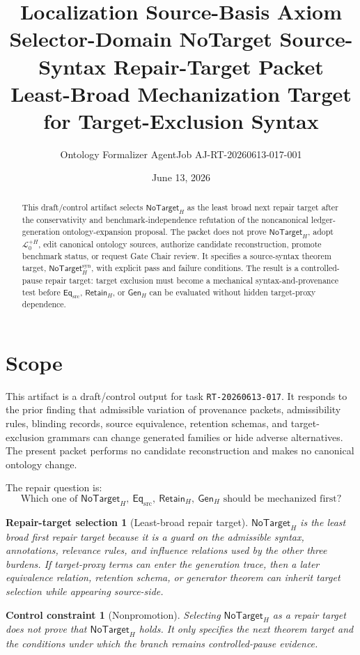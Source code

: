 \documentclass[11pt]{article}
\title{\textbf{Localization Source-Basis Axiom Selector-Domain NoTarget Source-Syntax Repair-Target Packet}\\[0.35em]
\large Least-Broad Mechanization Target for Target-Exclusion Syntax}
\author{Ontology Formalizer AgentJob AJ-RT-20260613-017-001}
\date{June 13, 2026}
\newcommand{\LangPlus}{\mathcal{L}_{0}^{+H}}
\newcommand{\GenH}{\mathsf{Gen}_{H}}
\newcommand{\EqSrc}{\mathsf{Eq}_{\mathrm{src}}}
\newcommand{\RetainH}{\mathsf{Retain}_{H}}
\newcommand{\NoTargetH}{\mathsf{NoTarget}_{H}}
\newcommand{\NoTargetSyn}{\mathsf{NoTarget}_{H}^{\mathrm{syn}}}
\newtheorem{selection}{Repair-target selection}
\newtheorem{constraint}{Control constraint}
\begin{document}
\maketitle

\begin{abstract}
This draft/control artifact selects \(\NoTargetH\) as the least broad next
repair target after the conservativity and benchmark-independence refutation
of the noncanonical ledger-generation ontology-expansion proposal. The
packet does not prove \(\NoTargetH\), adopt \(\LangPlus\), edit canonical
ontology sources, authorize candidate reconstruction, promote benchmark
status, or request Gate Chair review. It specifies a source-syntax theorem
target, \(\NoTargetSyn\), with explicit pass and failure conditions. The
result is a controlled-pause repair target: target exclusion must become a
mechanical syntax-and-provenance test before \(\EqSrc\), \(\RetainH\), or
\(\GenH\) can be evaluated without hidden target-proxy dependence.
\end{abstract}

\section{Scope}

This artifact is a draft/control output for task \texttt{RT-20260613-017}.
It responds to the prior finding that admissible variation of provenance
packets, admissibility rules, blinding records, source equivalence,
retention schemas, and target-exclusion grammars can change generated
families or hide adverse alternatives. The present packet performs no
candidate reconstruction and makes no canonical ontology change.

The repair question is:
\[
    \text{Which one of } \NoTargetH,\ \EqSrc,\ \RetainH,\ \GenH
    \text{ should be mechanized first?}
\]

\begin{selection}[Least-broad repair target]
\(\NoTargetH\) is the least broad first repair target because it is a
guard on the admissible syntax, annotations, relevance rules, and influence
relations used by the other three burdens. If target-proxy terms can enter
the generation trace, then a later equivalence relation, retention schema,
or generator theorem can inherit target selection while appearing
source-side.
\end{selection}

\begin{constraint}[Nonpromotion]
Selecting \(\NoTargetH\) as a repair target does not prove that
\(\NoTargetH\) holds. It only specifies the next theorem target and the
conditions under which the branch remains controlled-pause evidence.
\end{constraint}
\end{document}
